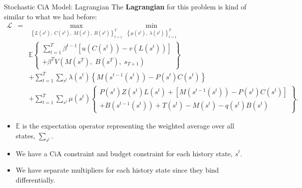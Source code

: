 \documentclass[10pt,c,aspectratio=1610,handout]{beamer}
\begin{document}
\begin{frame}{Stochastic CiA Model: Lagrangian}%
  The \textbf{Lagrangian} for this problem is kind of similar to what we had before:%
  \begin{eqnarray*}%
  \mathcal{L} &\mathcal{=}&\max_{\left\{L(s^{t}),\;C(s^{t}),\;M(s^{t}),\;B(s^{t})\right\} _{t=1}^{T}}\min_{\left\{ \mu(s^{t}),\;\lambda (s^{t})\right\} _{t=1}^{T}} \\%
  &&\mathbb{E}\left\{%
  \begin{array}{c}%
    \sum_{t=1}^T \beta ^{t-1}\left[ u(C(s^{t}))-v(L(s^{t}))\right] \\%
    +\beta ^{T}V(M(s^{T}),\;B(s^{T}),\;s_{T+1})%
  \end{array}%
  \right\} \\%
    &&+\sum_{t=1}^T\sum_{s^{t}}\lambda (s^{t})\left\{M(s^{t-1}(s^{t}))-P(s^{t})C(s^{t})\right\} \\%
    &&+\sum_{t=1}^T\sum_{s^{t}}\mu (s^{t})\left\{%
  \begin{array}{c}%
    P(s^{t})Z(s^{t})L(s^{t})+\left[ M(s^{t-1}(s^{t}))-P(s^{t})C(s^{t})\right] \\%
    +B(s^{t-1}(s^{t}))+T(s^{t})-M(s^{t})-q(s^{t})B(s^{t})%
  \end{array}%
  \right\}.%
  \end{eqnarray*}%
  \pause%
  \begin{itemize}%
    \item[$\blacktriangleright$] $\mathbb{E}$ is the expectation operator representing the weighted average over all states, $\sum_{s^t}$.%
    \item[$\blacktriangleright$] We have a CiA constraint and budget constraint for each history state, $s^t$.%
    \pause%
    \item[$\blacktriangleright$] We have separate multipliers for each history state since they bind differentially.%
  \end{itemize}%
\end{frame}%
\end{document}
